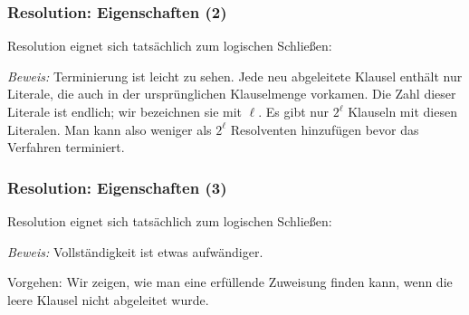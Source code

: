 \documentclass[onlymath]{beamer}
\begin{document}
\begin{frame}[t]\frametitle{Resolution: Eigenschaften (2)}

Resolution eignet sich tatsächlich zum logischen Schließen:\medskip


\emph{Beweis:} \alert{Terminierung} ist leicht zu sehen.\pause{}
Jede neu abgeleitete Klausel enthält nur Literale,
die auch in der ursprünglichen Klauselmenge vorkamen. Die Zahl dieser Literale ist endlich; wir bezeichnen sie mit
$\ell$. Es gibt nur $2^\ell$ Klauseln mit diesen Literalen. Man kann also weniger als $2^\ell$ Resolventen hinzufügen bevor das Verfahren terminiert.

\end{frame}

\begin{frame}[t]\frametitle{Resolution: Eigenschaften (3)}

Resolution eignet sich tatsächlich zum logischen Schließen:\medskip


\emph{Beweis:} \alert{Vollständigkeit} ist etwas aufwändiger.\medskip

Vorgehen: Wir zeigen, wie
man eine erfüllende Zuweisung finden kann, wenn die leere Klausel nicht abgeleitet wurde.

\end{frame}
\end{document}
